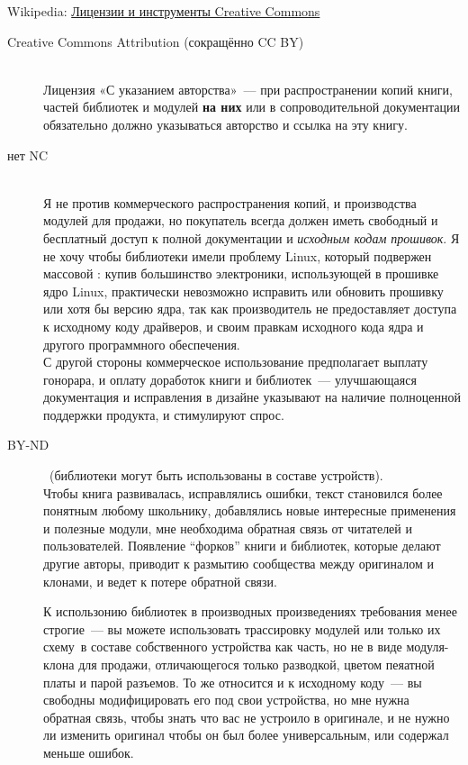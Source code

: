 Wikipedia:
\href{https://ru.wikipedia.org/wiki/%D0%9B%D0%B8%D1%86%D0%B5%D0%BD%D0%B7%D0%B8%D0%B8_%D0%B8_%D0%B8%D0%BD%D1%81%D1%82%D1%80%D1%83%D0%BC%D0%B5%D0%BD%D1%82%D1%8B_Creative_Commons}{Лицензии и инструменты Creative Commons}
\bigskip

\begin{description}
\item[Creative Commons Attribution (сокращённо CC BY)]\ \\
Лицензия «С указанием авторства»\ --- при распространении копий книги, частей
библиотек и модулей \textbf{на них} или в сопроводительной документации
обязательно должно указываться авторство и ссылка на эту книгу.

\item[нет NC]\ \\
Я не против коммерческого распространения копий, и производства модулей для
продажи, но покупатель всегда должен иметь свободный и бесплатный доступ
к полной документации и \emph{исходным кодам прошивок}. Я не хочу чтобы
библиотеки имели проблему Linux, который подвержен массовой :
купив большинство электроники, использующей в прошивке ядро Linux, практически
невозможно исправить или обновить прошивку или хотя бы версию ядра, так как
производитель не предоставляет доступа к исходному коду драйверов, и своим
правкам исходного кода ядра и другого программного обеспечения.\\
С другой стороны коммерческое использование предполагает выплату гонорара, и
оплату доработок книги и библиотек\ --- улучшающаяся документация и исправления
в дизайне указывают на наличие полноценной поддержки продукта, и стимулируют
спрос.

\item[BY-ND]\ (библиотеки могут быть использованы в составе устройств).\\
Чтобы книга развивалась, исправлялись ошибки, текст становился более понятным
любому школьнику, добавлялись новые интересные применения и полезные модули,
мне необходима обратная связь от читателей и пользователей. Появление
``форков'' книги и библиотек, которые делают другие авторы, приводит к размытию
сообщества между оригиналом и клонами, и ведет к потере обратной связи.

\medskip
К использонию библиотек в производных произведениях требования менее строгие\
--- вы можете использовать трассировку модулей или только их схему\note{чтобы
перетрассировать печатную плату}\ в составе собственного устройства как часть,
но не в виде модуля-клона для продажи, отличающегося только разводкой, цветом
пеяатной платы и парой разъемов. То же относится и к исходному коду\ --- вы
свободны модифицировать его под свои устройства, но мне нужна обратная связь,
чтобы знать что вас не устроило в оригинале, и не нужно ли изменить оригинал
чтобы он был более универсальным, или содержал меньше ошибок.

\end{description}

